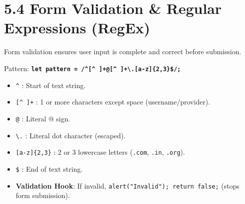 \section{5.4 Form Validation \& Regular Expressions (RegEx)}
Form validation ensures user input is complete and correct before submission.
\begin{summarybox}
Pattern: \textbf{\texttt{let pattern = /\textasciicircum[\textasciicircum\ ]+@[\textasciicircum\ ]+\textbackslash.[a-z]\{2,3\}\$/;}}
\begin{itemize}[leftmargin=*]
    \item \texttt{\textasciicircum} : Start of text string.
    \item \texttt{[\textasciicircum\ ]+} : 1 or more characters except space (username/provider).
    \item \texttt{@} : Literal @ sign.
    \item \texttt{\textbackslash.} : Literal dot character (escaped).
    \item \texttt{[a-z]\{2,3\}} : 2 or 3 lowercase letters (\texttt{.com}, \texttt{.in}, \texttt{.org}).
    \item \texttt{\$} : End of text string.
    \item \textbf{Validation Hook}: If invalid, \texttt{alert("Invalid"); return false;} (stops form submission).
\end{itemize}
\end{summarybox}

